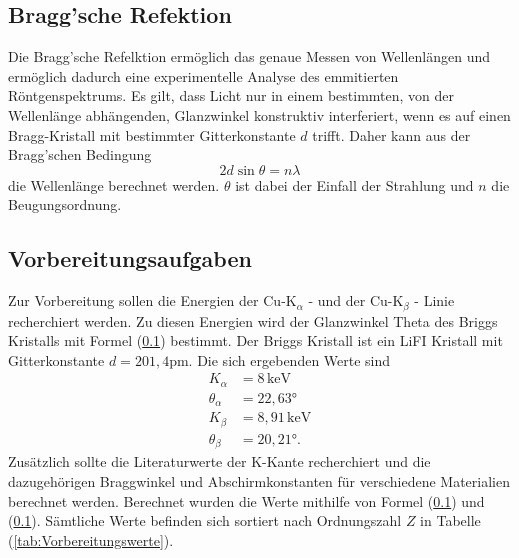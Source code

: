 \subsection{Bragg'sche Refektion}
Die Bragg'sche Refelktion ermöglich das genaue Messen von Wellenlängen und ermöglich dadurch eine experimentelle Analyse des emmitierten Röntgenspektrums. Es gilt, 
dass Licht nur in einem bestimmten, von der Wellenlänge abhängenden, Glanzwinkel konstruktiv interferiert, wenn es auf einen Bragg-Kristall mit bestimmter Gitterkonstante
$d$ trifft. Daher kann aus der Bragg'schen Bedingung 
\begin{equation}
    \label{eqn:Bragg_Bedingung}
    2 d \sin{\theta} = n \lambda
\end{equation}
die Wellenlänge berechnet werden. $\theta$ ist dabei der Einfall der Strahlung und $n$ die Beugungsordnung.
\subsection{Vorbereitungsaufgaben}
\label{sec:Vorbereitungsaufgaben}
Zur Vorbereitung sollen die Energien der $\text{Cu-K}_\alpha$ - und der $\text{Cu-K}_{\beta}$ - Linie recherchiert werden. Zu diesen Energien wird der Glanzwinkel 
Theta des Briggs Kristalls mit Formel (\ref{}) bestimmt. Der Briggs Kristall ist ein LiFI Kristall mit Gitterkonstante $d = 201,4 \unit{\pico\meter}$.
Die sich ergebenden Werte sind 
\begin{align*}
    K_\alpha &= 8 \, \si{\kilo\electronvolt}\\
    \theta_\alpha &= 22,63 \unit{\degree} \\
    K_\beta &= 8,91 \, \si{\kilo\electronvolt}\\
    \theta_\beta &= 20,21 \unit{\degree} .
\end{align*}
Zusätzlich sollte die Literaturwerte der K-Kante recherchiert und die dazugehörigen Braggwinkel und Abschirmkonstanten für verschiedene Materialien berechnet werden.
Berechnet wurden die Werte mithilfe von Formel (\ref{}) und (\ref{}).
Sämtliche Werte befinden sich sortiert nach Ordnungszahl $Z$ in Tabelle (\ref{tab:Vorbereitungswerte}).

